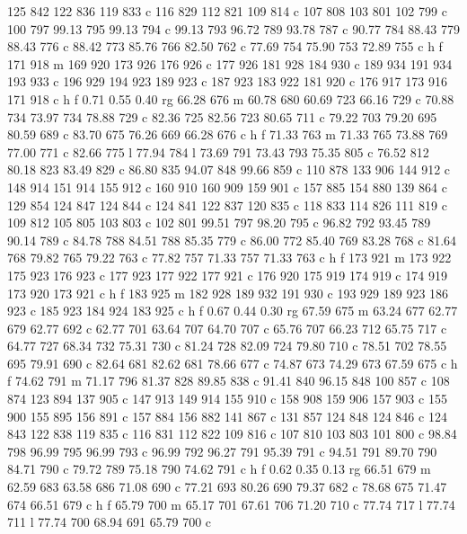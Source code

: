 {{   125 842 122 836 119 833 c
   116 829 112 821 109 814 c
   107 808 103 801 102 799 c
   100 797 99.13 795 99.13 794 c
   99.13 793 96.72 789 93.78 787 c
   90.77 784 88.43 779 88.43 776 c
   88.42 773 85.76 766 82.50 762 c
   77.69 754 75.90 753 72.89 755 c
   h f
   171 918 m
   169 920 173 926 176 926 c
   177 926 181 928 184 930 c
   189 934 191 934 193 933 c
   196 929 194 923 189 923 c
   187 923 183 922 181 920 c
   176 917 173 916 171 918 c
   h f
   0.71 0.55 0.40 rg
   66.28 676 m
   60.78 680 60.69 723 66.16 729 c
   70.88 734 73.97 734 78.88 729 c
   82.36 725 82.56 723 80.65 711 c
   79.22 703 79.20 695 80.59 689 c
   83.70 675 76.26 669 66.28 676 c
   h f
   71.33 763 m
   71.33 765 73.88 769 77.00 771 c
   82.66 775 l
   77.94 784 l
   73.69 791 73.43 793 75.35 805 c
   76.52 812 80.18 823 83.49 829 c
   86.80 835 94.07 848 99.66 859 c
   110 878 133 906 144 912 c
   148 914 151 914 155 912 c
   160 910 160 909 159 901 c
   157 885 154 880 139 864 c
   129 854 124 847 124 844 c
   124 841 122 837 120 835 c
   118 833 114 826 111 819 c
   109 812 105 805 103 803 c
   102 801 99.51 797 98.20 795 c
   96.82 792 93.45 789 90.14 789 c
   84.78 788 84.51 788 85.35 779 c
   86.00 772 85.40 769 83.28 768 c
   81.64 768 79.82 765 79.22 763 c
   77.82 757 71.33 757 71.33 763 c
   h f
   173 921 m
   173 922 175 923 176 923 c
   177 923 177 922 177 921 c
   176 920 175 919 174 919 c
   174 919 173 920 173 921 c
   h f
   183 925 m
   182 928 189 932 191 930 c
   193 929 189 923 186 923 c
   185 923 184 924 183 925 c
   h f
   0.67 0.44 0.30 rg
   67.59 675 m
   63.24 677 62.77 679 62.77 692 c
   62.77 701 63.64 707 64.70 707 c
   65.76 707 66.23 712 65.75 717 c
   64.77 727 68.34 732 75.31 730 c
   81.24 728 82.09 724 79.80 710 c
   78.51 702 78.55 695 79.91 690 c
   82.64 681 82.62 681 78.66 677 c
   74.87 673 74.29 673 67.59 675 c
   h f
   74.62 791 m
   71.17 796 81.37 828 89.85 838 c
   91.41 840 96.15 848 100 857 c
   108 874 123 894 137 905 c
   147 913 149 914 155 910 c
   158 908 159 906 157 903 c
   155 900 155 895 156 891 c
   157 884 156 882 141 867 c
   131 857 124 848 124 846 c
   124 843 122 838 119 835 c
   116 831 112 822 109 816 c
   107 810 103 803 101 800 c
   98.84 798 96.99 795 96.99 793 c
   96.99 792 96.27 791 95.39 791 c
   94.51 791 89.70 790 84.71 790 c
   79.72 789 75.18 790 74.62 791 c
   h f
   0.62 0.35 0.13 rg
   66.51 679 m
   62.59 683 63.58 686 71.08 690 c
   77.21 693 80.26 690 79.37 682 c
   78.68 675 71.47 674 66.51 679 c
   h f
   65.79 700 m
   65.17 701 67.61 706 71.20 710 c
   77.74 717 l
   77.74 711 l
   77.74 700 68.94 691 65.79 700 c
}}

